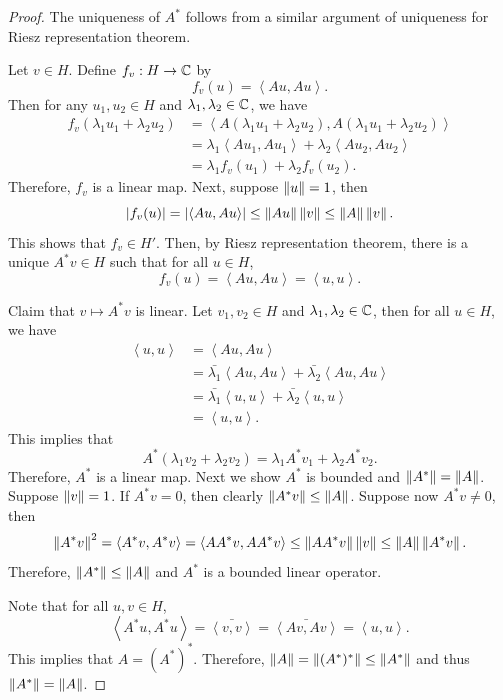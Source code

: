 \documentclass[a4paper]{article}
\renewcommand{\braket}[2]{\left\langle #1, #1 \right\rangle}
\begin{document}
\begin{proof}
  The uniqueness of $A^*$ follows from a similar argument
  of uniqueness for Riesz representation theorem.

  Let $v \in H$. Define $f_v : H \to \mathbb{C}$ by
  \[
    f_v(u) = \braket{A u}{v}.
  \]
  Then for any $u_1, u_2 \in H$ and $\lambda_1, \lambda_2 \in \mathbb{C}$,
  we have
  \[
    \begin{aligned}
      f_v(\lambda_1 u_1 + \lambda_2 u_2)
       & = \braket{A (\lambda_1 u_1 + \lambda_2 u_2)}{v}             \\
       & = \lambda_1 \braket{A u_1}{v} + \lambda_2 \braket{A u_2}{v} \\
       & = \lambda_1 f_v(u_1) + \lambda_2 f_v(u_2).
    \end{aligned}
  \]
  Therefore, $f_v$ is a linear map. Next,
  suppose $\left\lVert u\right\rVert = 1$, then
  \[
    \abs{f_v(u)} = \abs{\braket{Au}{v}}
    \leq \norm{Au}\norm{v} \leq \norm{A} \norm{v}.
  \]
  This shows that $f_v \in H'$. Then, by Riesz
  representation theorem, there is a unique $A^* v \in H$
  such that for all $u \in H$,
  \[
    f_v(u) = \braket{Au}{v} = \braket{u}{A^* v}.
  \]

  Claim that $v \mapsto A^* v$ is linear. Let $v_1, v_2 \in H$
  and $\lambda_1, \lambda_2 \in \mathbb{C}$, then for all $u \in H$,
  we have
  \[
    \begin{aligned}
      \braket{u}{A^*(\lambda_1 v_2 + \lambda_2 v_2)}
       & = \braket{Au}{\lambda_1 v_2 + \lambda_2 v_2}            \\
       & = \bar{\lambda_1} \braket{Au}{v_1} + \bar{\lambda_2}
      \braket{Au}{v_2}                                           \\
       & = \bar{\lambda_1} \braket{u}{A^* v_1} + \bar{\lambda_2}
      \braket{u}{A^* v_2}                                        \\
       & = \braket{u}{\lambda_1 A^* v_1 + \lambda_2 A^* v_2}.
    \end{aligned}
  \]
  This implies that
  \[
    A^* (\lambda_1 v_2 + \lambda_2 v_2)
    = \lambda_1 A^* v_1 + \lambda_2 A^* v_2.
  \]
  Therefore, $A^*$ is a linear map. Next we show
  $A^*$ is bounded and $\left\lVert A^*\right\rVert = \left\lVert A\right\rVert$. Suppose
  $\left\lVert v\right\rVert = 1$. If $A^* v = 0$, then clearly $\left\lVert A^* v\right\rVert
    \leq \left\lVert A\right\rVert$. Suppose now $A^* v \neq 0$, then
  \[
    \norm{A^* v}^2 = \braket{A^* v}{A^* v}
    = \braket{A A^* v}{v} \leq \norm{A A^* v} \norm{v}
    \leq \norm{A} \norm{A^* v}.
  \]
  Therefore, $\left\lVert A^*\right\rVert \leq \left\lVert A\right\rVert$ and $A^*$ is a bounded
  linear operator.

  Note that for all $u, v \in H$,
  \[
    \braket{A^* u}{v} = \bar{\braket{v}{A^* u}}
    = \bar{\braket{A v}{u}} = \braket{u}{A v}.
  \]
  This implies that $A = \left( A^* \right)^*$.
  Therefore, $\left\lVert A\right\rVert = \left\lVert (A^*)^*\right\rVert \leq \left\lVert A^*\right\rVert$
  and thus $\left\lVert A^*\right\rVert = \left\lVert A\right\rVert$.
\end{proof}
\end{document}
